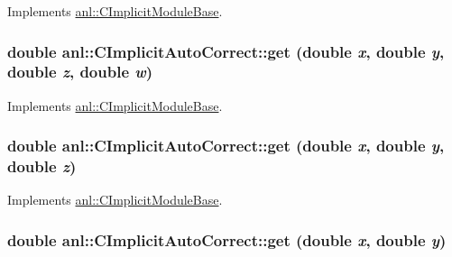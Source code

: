 Implements \hyperlink{classanl_1_1CImplicitModuleBase_aa40b7d54572197612a4fea44b63447eb}{anl::CImplicitModuleBase}.\hypertarget{classanl_1_1CImplicitAutoCorrect_a6f0ceb8d4b002577185b2004c77f9375}{
\subsubsection[{get}]{\setlength{\rightskip}{0pt plus 5cm}double anl::CImplicitAutoCorrect::get (double {\em x}, \/  double {\em y}, \/  double {\em z}, \/  double {\em w})}}
\label{classanl_1_1CImplicitAutoCorrect_a6f0ceb8d4b002577185b2004c77f9375}


Implements \hyperlink{classanl_1_1CImplicitModuleBase_a3cf520bdab59631864253c03b4e1723f}{anl::CImplicitModuleBase}.\hypertarget{classanl_1_1CImplicitAutoCorrect_a8b9fafdbf1e508a461d8fca1e60172eb}{
\subsubsection[{get}]{\setlength{\rightskip}{0pt plus 5cm}double anl::CImplicitAutoCorrect::get (double {\em x}, \/  double {\em y}, \/  double {\em z})}}
\label{classanl_1_1CImplicitAutoCorrect_a8b9fafdbf1e508a461d8fca1e60172eb}


Implements \hyperlink{classanl_1_1CImplicitModuleBase_ac17d592612c82ba3d47f9229a00b1fe3}{anl::CImplicitModuleBase}.\hypertarget{classanl_1_1CImplicitAutoCorrect_a134b304eeb21068a96cbdcb8427af104}{
\subsubsection[{get}]{\setlength{\rightskip}{0pt plus 5cm}double anl::CImplicitAutoCorrect::get (double {\em x}, \/  double {\em y})}}
\label{classanl_1_1CImplicitAutoCorrect_a134b304eeb21068a96cbdcb8427af104}


